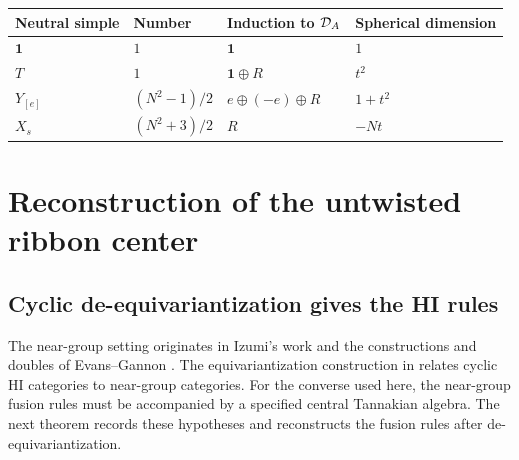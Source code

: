 \documentclass[11pt,a4paper]{article}
\numberwithin{equation}{section}
\theoremstyle{definition}\newtheorem{definition}[theorem]{Definition}
\theoremstyle{remark}\newtheorem{remark}[theorem]{Remark}
\newcommand{\one}{\mathbf1}\newcommand{\B}{\mathcal B}\newcommand{\W}{W_N}
\begin{document}
\begin{center}
\begin{tabular}{llll}
\toprule
Neutral simple & Number & Induction to \(\mathcal D_A\) & Spherical dimension\\
\midrule
\(\one\) & \(1\) & \(\one\) & \(1\)\\
\(T\) & \(1\) & \(\one\oplus R\) & \(t^2\)\\
\(Y_{[e]}\) & \((N^2-1)/2\) & \(e\oplus(-e)\oplus R\) & \(1+t^2\)\\
\(X_s\) & \((N^2+3)/2\) & \(R\) & \(-Nt\)\\
\bottomrule
\end{tabular}
\end{center}


\section{Reconstruction of the untwisted ribbon center}
\label{sec:actual-center}

\subsection{Cyclic de-equivariantization gives the HI rules}
\label{sec:cyclic-reconstruction}

The near-group setting originates in Izumi's work \cite{izumi}
and the constructions and doubles of Evans--Gannon
\cite{evansgannon2014,evansgannon2017}.
The equivariantization construction in \cite[Section 6]{gsy}
relates cyclic HI categories to near-group categories. For the
converse used here, the near-group fusion rules must be accompanied
by a specified central Tannakian algebra. The next theorem records
these hypotheses and reconstructs the fusion rules after
de-equivariantization.
\end{document}
